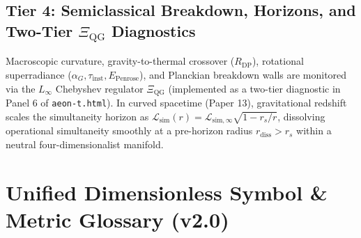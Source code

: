 \documentclass[11pt,a4paper]{article}
\begin{document}
\subsection{Tier 4: Semiclassical Breakdown, Horizons, and Two-Tier \texorpdfstring{$\Xi_{\mathrm{QG}}$}{Xi\_QG} Diagnostics}
Macroscopic curvature, gravity-to-thermal crossover ($R_{\mathrm{DP}}$), rotational superradiance ($\alpha_G, \tau_{\mathrm{inst}}, E_{\mathrm{Penrose}}$), and Planckian breakdown walls are monitored via the $L_\infty$ Chebyshev regulator $\Xi_{\mathrm{QG}}$ (implemented as a two-tier diagnostic in Panel 6 of \texttt{aeon-t.html}). In curved spacetime (Paper 13), gravitational redshift scales the simultaneity horizon as $\mathcal{L}_{\mathrm{sim}}(r) = \mathcal{L}_{\mathrm{sim},\infty}\sqrt{1 - r_s/r}$, dissolving operational simultaneity smoothly at a pre-horizon radius $r_{\mathrm{diss}} > r_s$ within a neutral four-dimensionalist manifold.

\section{Unified Dimensionless Symbol \& Metric Glossary (v2.0)}
\end{document}
